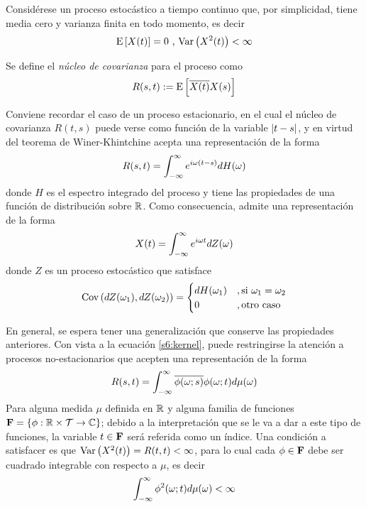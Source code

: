 Considérese un proceso estocástico
a tiempo continuo \xtin{\R} que, por simplicidad, tiene media cero y varianza finita en todo 
momento, es decir
\begin{equation*}
\mathrm{E}\left[ X(t) \right] = 0 \text{  ,  } \mathrm{Var}\left( X^{2}(t) \right) < \infty
\end{equation*}

Se define el \textit{núcleo de covarianza} para el proceso como
\begin{equation}
R(s,t) := \mathrm{E}\left[ \overline{X(t)}X(s) \right]
\end{equation}

Conviene recordar el caso de un proceso estacionario, en el cual el núcleo de covarianza $R(t,s)$ 
puede verse como función de la variable $\left| t-s \right|$, y en virtud del teorema de Winer-Khintchine 
acepta una representación de la forma
%
\begin{equation}
R(s,t) = \int_{-\infty}^{\infty} e^{i \omega (t-s)} dH(\omega)
\label{s6:kernel}
\end{equation}
%
donde $H$ es el espectro integrado del proceso y tiene las propiedades de una función de 
distribución sobre $\mathbb{R}$.
%
Como consecuencia, \xtin{\R} admite una representación de la forma
\begin{equation}
X(t) = \int_{-\infty}^{\infty} e^{i\omega t} dZ(\omega)
\end{equation}
%
donde $Z$ es un proceso estocástico que satisface
\begin{equation}
\mathrm{Cov}\left( dZ(\omega_1),dZ(\omega_2) \right) = 
\begin{cases}
dH(\omega_1) &, \text{si } \omega_1 = \omega_2 \\
0 &, \text{otro caso}
\end{cases}
\end{equation}

En general, se espera tener una generalización que conserve las propiedades anteriores. Con vista
a la ecuación \ref{s6:kernel}, puede restringirse la atención a procesos no-estacionarios que
acepten una representación de la forma
\begin{equation}
R(s,t) = \int_{-\infty}^{\infty} \overline{\phi(\omega;s)}\phi(\omega;t) d\mu(\omega)
\label{s6:erre}
\end{equation}
%
Para alguna medida $\mu$ definida en $\mathbb{R}$ y alguna familia de funciones 
$\mathbf{F} = \left\{ \phi: \mathbb{R} \times \mathcal{T} \rightarrow \mathbb{C} \right\}$; debido a la interpretación que 
se le va a dar a este tipo de funciones, la variable $t\in \mathbf{F}$ será referida como un índice.
%
Una condición a satisfacer es que $\mathrm{Var}\left( X^{2}(t) \right) = R(t,t) < \infty$, para lo cual cada 
$\phi \in \mathbf{F}$ debe ser cuadrado integrable con respecto a $\mu$, es decir
\begin{equation}
\int_{-\infty}^{\infty} \phi^{2}(\omega;t) d\mu(\omega) < \infty
\end{equation}

